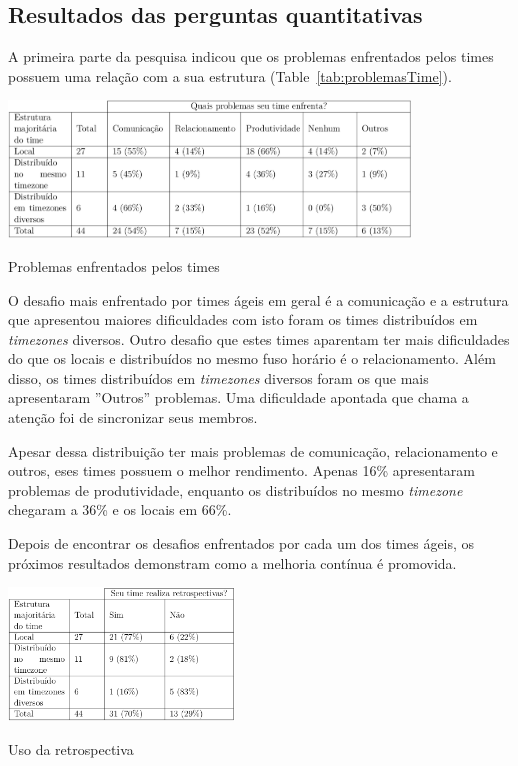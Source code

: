 \documentclass[12pt]{article}
\begin{document}
\subsection{Resultados das perguntas quantitativas}

A primeira parte da pesquisa indicou que os problemas enfrentados pelos times possuem uma relação com a sua estrutura (Table~\ref{tab:problemasTime}).

\begin{table}[ht]
\centering
\includegraphics[width=0.8\textwidth]{problemasTime.png}
\caption{Problemas enfrentados pelos times}
\label{tab:problemasTime}
\end{table}

O desafio mais enfrentado por times ágeis em geral é a comunicação e a estrutura que apresentou maiores dificuldades com isto foram os times distribuídos em \textit{timezones} diversos. Outro desafio que estes times aparentam ter mais dificuldades do que os locais e distribuídos no mesmo fuso horário é o relacionamento. Além disso, os times distribuídos em \textit{timezones} diversos foram os que mais apresentaram ''Outros'' problemas. Uma dificuldade apontada que chama a atenção foi de sincronizar seus membros.

Apesar dessa distribuição ter mais problemas de comunicação, relacionamento e outros, eses times possuem o melhor rendimento. Apenas 16\% apresentaram problemas de produtividade, enquanto os distribuídos no mesmo \textit{timezone} chegaram a 36\% e os locais em 66\%.

Depois de encontrar os desafios enfrentados por cada um dos times ágeis, os próximos resultados demonstram como a melhoria contínua é promovida.

\begin{table}[ht]
\centering
\includegraphics[width=0.45\textwidth]{retrospectiva.png}
\caption{Uso da retrospectiva}
\label{tab:retrospectiva}
\end{table}
\end{document}
